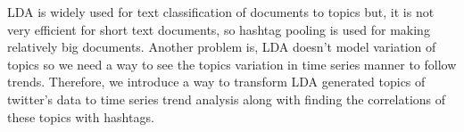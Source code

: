 LDA is widely used for text classification of documents to topics but, it is not very efficient for short text documents, so hashtag pooling is used for making relatively big documents. Another problem is, LDA doesn't model variation of topics so we need a way to see the topics variation in time series manner to follow trends. Therefore, we introduce a way to transform LDA generated topics of twitter's data to time series trend analysis along with finding the correlations of these topics with hashtags.